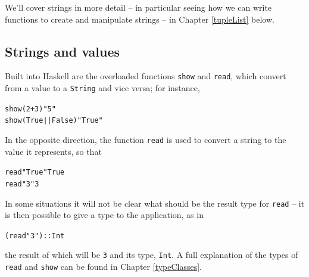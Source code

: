 We'll cover strings in more detail -- in particular seeing how we can write functions to create and manipulate strings -- in Chapter \ref{tupleList} below. 

\begin{figure}[t]
\end{figure}


\subsection*{Strings and values}

Built into Haskell are the overloaded functions \texttt{show}
and \texttt{read}, which convert from a value to a
\texttt{String} and
vice versa; for instance,
\begin{alltt}
show (2+3)           \step{}"5"
show (True || False) \step{}"True"
\end{alltt}
In the opposite direction, the function \texttt{read} is used to convert
a string to the value it represents, so that
\begin{alltt}
read "True" \step{}True
read "3"    \step{}3
\end{alltt}
In some situations it will not be clear what should be the result type
for
\texttt{read} -- it is then possible to give a type to the application,
as in
\begin{alltt}
(read "3") :: Int
\end{alltt}
the  result of which will be \texttt{3} and its type, \texttt{Int}. 
A
full explanation of the types of \texttt{read} and \texttt{show} can be
found in Chapter \ref{typeClasses}.











